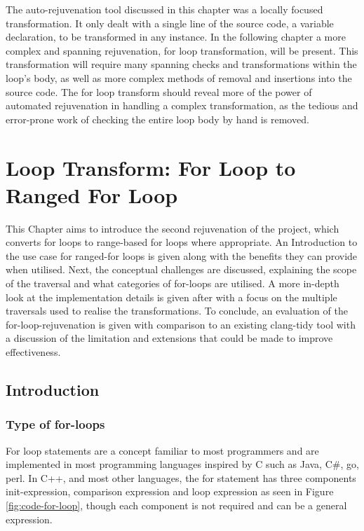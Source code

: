\documentclass[bsc,frontabs,singlespacing,twoside,parskip,deptreport]{infthesis}
\begin{document}
The auto-rejuvenation tool discussed in this chapter was a locally focused transformation. It only dealt with a single line of the source code, a variable declaration, to be transformed in any instance. In the following chapter a more complex and spanning rejuvenation, for loop transformation, will be present. This transformation will require many spanning checks and transformations within the loop's body, as well as more complex methods of removal and insertions into the source code. The for loop transform should reveal more of the power of automated rejuvenation in handling a complex transformation, as the tedious and error-prone work of checking the entire loop body by hand is removed.



\chapter{Loop Transform: For Loop to Ranged For Loop}\label{chp:loop-transform}

This Chapter aims to introduce the second rejuvenation of the project, which converts for loops to range-based for loops where appropriate. An Introduction to the use case for ranged-for loops is given along with the benefits they can provide when utilised. Next, the conceptual challenges are discussed, explaining the scope of the traversal and what categories of for-loops are utilised. A more in-depth look at the implementation details is given after with a focus on the multiple traversals used to realise the transformations. To conclude, an evaluation of the for-loop-rejuvenation is given with comparison to an existing clang-tidy tool with a discussion of the limitation and extensions that could be made to improve effectiveness.

\section{Introduction}
\subsection{Type of for-loops}
For loop statements are a concept familiar to most programmers and are implemented in most programming languages inspired by C such as Java, C\#, go, perl. In C++, and most other languages, the for statement has three components init-expression, comparison expression and loop expression as seen in Figure \ref{fig:code-for-loop}, though each component is not required and can be a general expression. 
\end{document}
